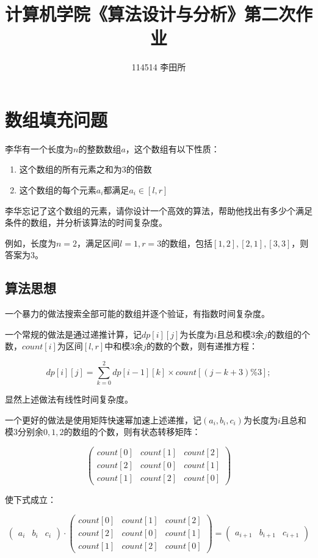 \documentclass{article}
\title{\heiti 计算机学院《算法设计与分析》第二次作业}
\author{114514 李田所}
\begin{document}
\maketitle

\section{数组填充问题}

李华有一个长度为$n$的整数数组$a$，这个数组有以下性质：

\begin{enumerate}[itemindent=3em]
    \item 这个数组的所有元素之和为$3$的倍数
    \item 这个数组的每个元素$a_i$都满足$a_i\in[l,r]$
\end{enumerate}

李华忘记了这个数组的元素，请你设计一个高效的算法，帮助他找出有多少个满足条件的数组，并分析该算法的时间复杂度。

例如，长度为$n=2$，满足区间$l=1,r=3$的数组，包括$[1,2],[2,1],[3,3]$，则答案为$3$。

\subsection{算法思想}

一个暴力的做法搜索全部可能的数组并逐个验证，有指数时间复杂度。

一个常规的做法是通过递推计算，记$dp[i][j]$为长度为$i$且总和模$3$余$j$的数组的个数，$count[i]$为区间$[l,r]$中和模$3$余$j$的数的个数，则有递推方程：

$$
dp[i][j]=\sum_{k=0}^2dp[i-1][k]\times{count}[(j-k+3)\%3];
$$

显然上述做法有线性时间复杂度。

一个更好的做法是使用矩阵快速幂加速上述递推，记$(a_i,b_i,c_i)$为长度为$i$且总和模$3$分别余$0,1,2$的数组的个数，则有状态转移矩阵：

$$
\begin{pmatrix}
    count[0]&count[1]&count[2]\\
    count[2]&count[0]&count[1]\\
    count[1]&count[2]&count[0]
\end{pmatrix}
$$

使下式成立：

$$
\begin{pmatrix}
    a_i&b_i&c_i
\end{pmatrix}
\cdot
\begin{pmatrix}
    count[0]&count[1]&count[2]\\
    count[2]&count[0]&count[1]\\
    count[1]&count[2]&count[0]
\end{pmatrix}
=
\begin{pmatrix}
    a_{i+1}&b_{i+1}&c_{i+1}
\end{pmatrix}
$$
\end{document}
